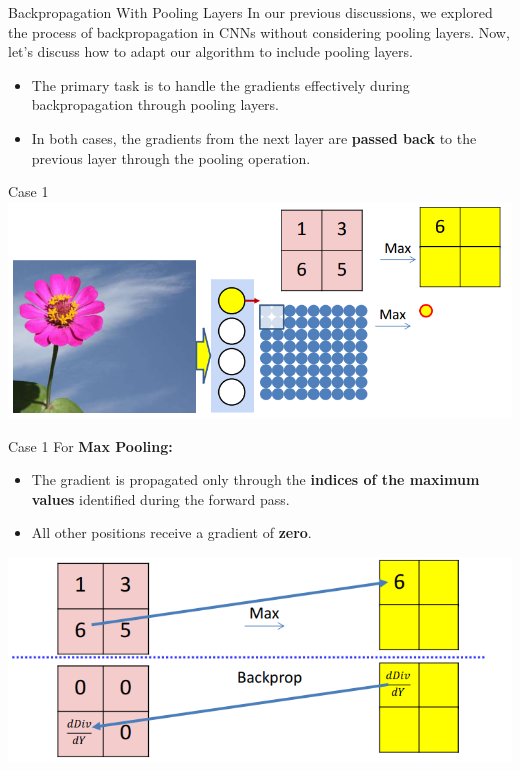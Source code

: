 \documentclass[default, aspectratio=169]{beamer}
\begin{document}
	
	
	
	
	
	\begin{frame}{Backpropagation With Pooling Layers}
		\large
		In our previous discussions, we explored the process of backpropagation in CNNs without considering pooling layers. Now, let's discuss how to adapt our algorithm to include pooling layers.
		
		\begin{itemize}
			\item 	The primary task is to handle the gradients effectively during backpropagation through pooling layers.
			\item In both cases, the gradients from the next layer are \textbf{passed back} to the previous layer through the pooling operation.
			
		\end{itemize}
	\end{frame}
	
	\begin{frame}{Case 1}
		\centering
		\includegraphics[keepaspectratio, scale=0.7]{pic/pconv1.png}
	\end{frame}
	
	\begin{frame}{Case 1}
		For \textbf{Max Pooling:}
		\begin{itemize}
			\item The gradient is propagated only through the \textbf{indices of the maximum values} identified during the forward pass.
			\item All other positions receive a gradient of \textbf{zero}.
		\end{itemize}
		\centering
		\includegraphics[keepaspectratio, scale=0.5]{pic/pconv2.png}
	\end{frame}
	
\end{document}
